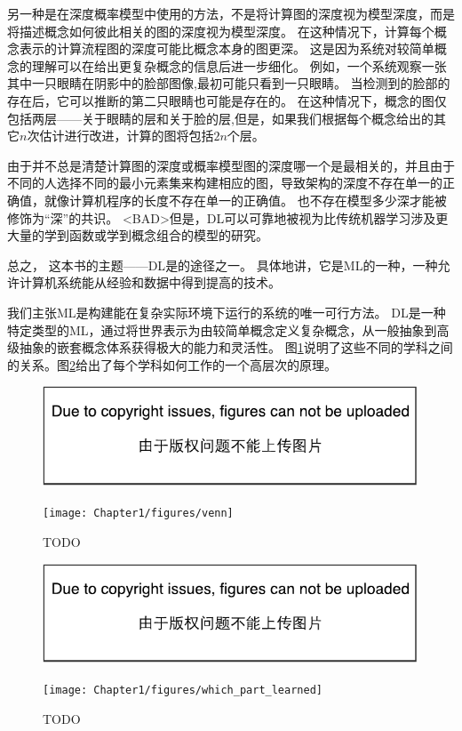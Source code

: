另一种是在深度概率模型中使用的方法，不是将计算图的深度视为模型深度，而是将描述概念如何彼此相关的图的深度视为模型深度。
在这种情况下，计算每个概念表示的计算流程图的深度可能比概念本身的图更深。
这是因为系统对较简单概念的理解可以在给出更复杂概念的信息后进一步细化。
例如，一个系统观察一张其中一只眼睛在阴影中的脸部图像,最初可能只看到一只眼睛。
当检测到的脸部的存在后，它可以推断的第二只眼睛也可能是存在的。
在这种情况下，概念的图仅包括两层——关于眼睛的层和关于脸的层,但是，如果我们根据每个概念给出的其它$n$次估计进行改进，计算的图将包括$2n$个层。


由于并不总是清楚计算图的深度或概率模型图的深度哪一个是最相关的，并且由于不同的人选择不同的最小元素集来构建相应的图，导致架构的深度不存在单一的正确值，就像计算机程序的长度不存在单一的正确值。
也不存在模型多少深才能被修饰为``深''的共识。
<BAD>但是，\gls{DL}可以可靠地被视为比传统机器学习涉及更大量的学到函数或学到概念组合的模型的研究。

总之， 这本书的主题——\gls{DL}是的途径之一。
具体地讲，它是\gls{ML}的一种，一种允许计算机系统能从经验和数据中得到提高的技术。

我们主张\gls{ML}是构建能在复杂实际环境下运行的系统的唯一可行方法。
\gls{DL}是一种特定类型的\gls{ML}，通过将世界表示为由较简单概念定义复杂概念，从一般抽象到高级抽象的嵌套概念体系获得极大的能力和灵活性。
图\ref{fig:chap1_venn}说明了这些不同的学科之间的关系。图\ref{fig:chap1_which_part_learned}给出了每个学科如何工作的一个高层次的原理。
\begin{figure}[!hbt]
\ifOpenSource
\centerline{\includegraphics{figure.pdf}}
\else
\centerline{\texttt{[image: Chapter1/figures/venn]}}
\fi
\caption{TODO}
\label{fig:chap1_venn}
\end{figure}
\begin{figure}[!htb]
\ifOpenSource
\centerline{\includegraphics{figure.pdf}}
\else
\centerline{\texttt{[image: Chapter1/figures/which\_part\_learned]}}
\fi
\caption{TODO}
\label{fig:chap1_which_part_learned}
\end{figure}

